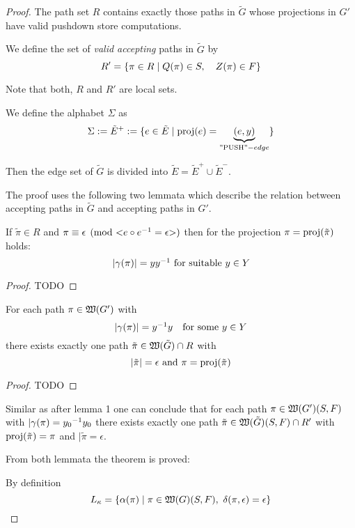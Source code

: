 \begin{proof}
The path set $R$ contains exactly those paths in $\tilde{G}$ whose projections
in $G'$ have valid pushdown store computations.

We define the set of {\em valid accepting} paths in $\tilde{G}$ by
\begin{equation*}
R' = \mbox{$\{\pi \in R \mid Q(\pi) \in S,\quad Z(\pi) \in F\}$}
\end{equation*}

Note that both, $R$ and $R'$ are local sets.

We define the alphabet $\Sigma$ as 
\begin{equation*}
\Sigma := \tilde{E}^+ := \mbox{$\{e \in \tilde{E} \mid \mathrm{proj}({e}) =
\underbrace{(e,y)}_{\text{''PUSH''}-edge}\}$}
\end{equation*}

Then the edge set of $\tilde{G}$ is divided into $\tilde{E} = \tilde{E}^+ \cup
\tilde{E}^-$.

The proof uses the following two lemmata which describe the relation between
accepting paths in $\tilde{G}$ and accepting paths in $G'$.

\begin{lemma}
If $\tilde{\pi} \in R$ and $\pi \equiv \epsilon \pmod{{<}e\circ \mbox{${e}^{-1}$} =
\epsilon{>}}$ then for the projection $\pi = \mathrm{proj}({\tilde{\pi}})$ holds:
\[ |\gamma(\pi)| = y \mbox{${y}^{-1}$}\text{ for suitable }y \in Y \]
\end{lemma}

\begin{proof}
TODO
\end{proof}

\begin{lemma}
For each path $\pi \in \mbox{$\mathfrak{W}({G'})$}$ with
\[ |\gamma(\pi)| = \mbox{${y}^{-1}$} y \quad\text{for some }y \in Y \]
there exists exactly one path $\tilde{\pi} \in \mbox{$\mathfrak{W}({\tilde{G}})$} \cap R$ with
\[ |\tilde{\pi}| = \epsilon\text{ and }\pi = \mathrm{proj}({\tilde{\pi}}) \] 
\end{lemma}

\begin{proof}
TODO
\end{proof}

Similar as after lemma 1 one can conclude that for each path $\pi \in
\mbox{$\mathfrak{W}({G'})$}(S, F)$ with $|\gamma(\pi) = \mbox{${y_0}^{-1}$}y_0$ there exists exactly one
path $\tilde{\pi} \in \mbox{$\mathfrak{W}({\tilde{G}})$}(S, F) \cap R'$ with
$\mathrm{proj}({\tilde{\pi}}) = \pi$ and $|\tilde{\pi} = \epsilon$.

From both lemmata the theorem is proved:

By definition
\[ L_\kappa = \mbox{$\{\alpha(\pi) \mid \pi \in \mbox{$\mathfrak{W}({G})$}(S, F),\ \delta(\pi,
\epsilon) = \epsilon\}$} \]


\end{proof}
